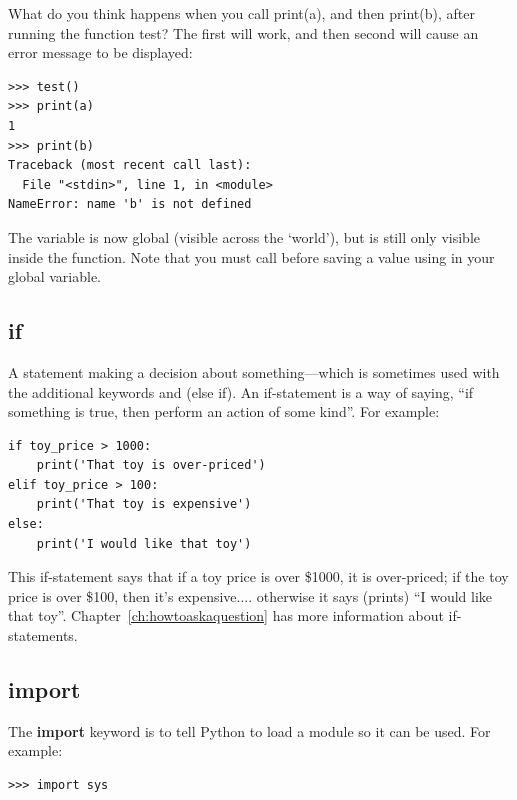 What do you think happens when you call print(a), and then print(b), after running the function test?  The first will work, and then second will cause an error message to be displayed:

\begin{listing}
\begin{verbatim}
>>> test()
>>> print(a)
1
>>> print(b)
Traceback (most recent call last):
  File "<stdin>", line 1, in <module>
NameError: name 'b' is not defined
\end{verbatim}
\end{listing}

The variable  is now global (visible across the `world'), but  is still only visible inside the function.  Note that you must call  before saving a value using in your global variable.

\subsection*{if}

A statement making a decision about something---which is sometimes used with the additional keywords  and  (else if).  An if-statement is a way of saying, ``if something is true, then perform an action of some kind''.  For example:

\begin{listing}
\begin{verbatim}
if toy_price > 1000:
    print('That toy is over-priced')
elif toy_price > 100:
    print('That toy is expensive')
else:
    print('I would like that toy')
\end{verbatim}
\end{listing}

This if-statement says that if a toy price is over \$1000, it is over-priced; if the toy price is over \$100, then it's expensive.... otherwise it says (prints) ``I would like that toy''. Chapter~\ref{ch:howtoaskaquestion} has more information about if-statements.

\subsection*{import}

The \textbf{import} keyword is to tell Python to load a module so it can be used. For example:

\begin{listing}
\begin{verbatim}
>>> import sys
\end{verbatim}
\end{listing}

